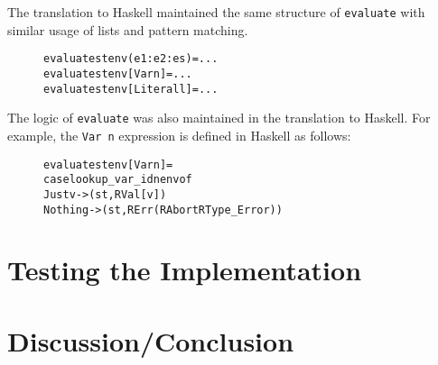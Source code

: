 The translation to Haskell maintained the same structure of \texttt{evaluate}
with similar usage of lists and pattern matching.

\begin{figure}[H]
\begin{alltt}
  evaluate st env (e1:e2:es)  = ...
  evaluate st env [Var n]     = ...
  evaluate st env [Literal l] = ...
\end{alltt}
\end{figure}

\noindent The logic of \texttt{evaluate} was also maintained in the translation
to Haskell. For example, the \texttt{Var n} expression is defined in Haskell as
follows:

\begin{figure}[H]
\begin{alltt}
  evaluate st env [Var n] =
    case lookup_var_id n env of
      Just v  -> (st, RVal [v])
      Nothing -> (st, RErr (RAbort RType_Error))
\end{alltt}
\end{figure}

\section{Testing the Implementation}


\section{Discussion/Conclusion}
